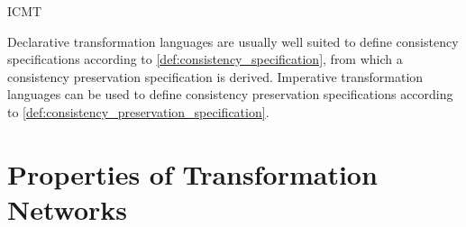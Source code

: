 \begin{copiedFrom}{ICMT}

Declarative transformation languages are usually well suited to define consistency specifications according to \autoref{def:consistency_specification}, 
from which a consistency preservation specification is %
derived. 
Imperative transformation languages can be used to define consistency preservation specifications according to \autoref{def:consistency_preservation_specification}. 

\end{copiedFrom} %


\section{Properties of Transformation Networks}

